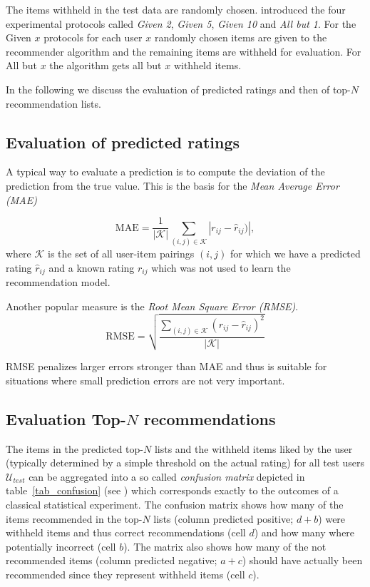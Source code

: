 \documentclass[nojss]{jss}
\newcommand{\set}[1]{\mathcal{#1}}
\begin{document}
The items withheld in the test data are randomly chosen.
\cite{recommender:Breese:1998} introduced the four experimental protocols
called {\em Given 2}, {\em Given 5}, {\em Given 10} and {\em All but 1}. For
the Given $x$ protocols for each user $x$ randomly chosen items are given to
the recommender algorithm and the remaining items are withheld for evaluation.
For All but $x$ the algorithm gets all but $x$ withheld items.

In the following we discuss the evaluation of predicted ratings
and then of top-$N$ recommendation lists.

\subsection{Evaluation of predicted ratings}

A typical way to evaluate a prediction is to compute 
the deviation of the prediction from the true value. 
This is the basis for the \emph{Mean
Average Error (MAE)}

\begin{equation}
\mathrm{MAE} = \frac{1}{|\set{K}|} \sum_{(i,j)\in \set{K}} |r_{ij} - \hat{r}_{ij})|,
\end{equation}
where $\set{K}$ is the set of all user-item pairings  $(i,j)$ 
for which we have a predicted rating $\hat{r}_{ij}$ and a known rating
$r_{ij}$ which was not used to learn the recommendation model.

Another popular measure is the \emph{Root Mean Square Error (RMSE)}.
\begin{equation}
\mathrm{RMSE} = \sqrt{\frac{\sum_{(i,j)\in \set{K}} (r_{ij} - \hat{r}_{ij})^2}{|\set{K}|}}
\end{equation}

RMSE penalizes larger errors stronger than MAE and thus is suitable for
situations where small prediction errors are not very important.

\subsection{Evaluation Top-$N$ recommendations}

The items in the predicted top-$N$ lists and the 
withheld items  liked by the user (typically determined by a simple threshold
on the actual rating) for all test users $\set{U}_{test}$ 
can be aggregated into a so called {\em confusion matrix} depicted in
table~\ref{tab_confusion} (see \cite{recommender:Kohavi:1998}) 
which corresponds
exactly to the outcomes of a classical statistical experiment.
The confusion matrix shows how many of the items recommended in
the top-$N$ lists (column predicted positive; $d+b$) 
were withheld items and thus correct recommendations
(cell $d$) and how many where potentially incorrect (cell $b$). 
The matrix also shows
how many of the not recommended items
(column predicted negative; $a+c$) 
should have actually been recommended since they represent withheld items (cell $c$). 
\end{document}
